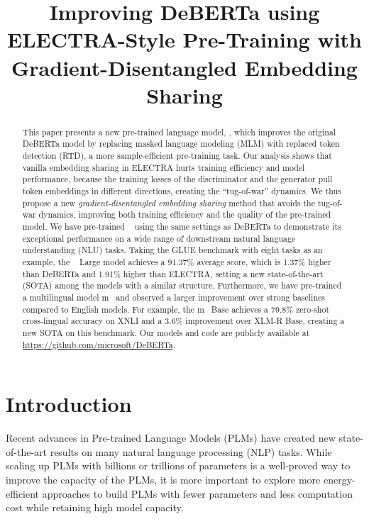 \title{Improving DeBERTa using ELECTRA-Style Pre-Training with Gradient-Disentangled Embedding Sharing}

\begin{abstract}
This paper presents a new pre-trained language model, \ModelName, which improves the original DeBERTa model by replacing masked language modeling (MLM) with replaced token detection (RTD), a more sample-efficient pre-training task. Our analysis shows that vanilla embedding sharing in ELECTRA hurts training efficiency and model performance, because the training losses of the discriminator and the generator pull token embeddings in different directions, creating the ``tug-of-war'' dynamics. We thus propose a new \emph{gradient-disentangled embedding sharing} method that avoids the tug-of-war dynamics, improving both training efficiency and the quality of the pre-trained model. We have pre-trained \ModelName~ using the same settings as  DeBERTa to demonstrate its exceptional performance on a wide range of downstream natural language understanding (NLU) tasks. Taking the GLUE benchmark with eight tasks as an example, the \ModelName~ Large model achieves a 91.37\% average score, which is 1.37\% higher than DeBERTa and 1.91\% higher than ELECTRA, setting a new state-of-the-art (SOTA) among the models with a similar structure. Furthermore, we have pre-trained a multilingual model m\ModelName~ and observed a larger improvement over strong baselines compared to  English models. For example, the m\ModelName~ Base achieves a 79.8\% zero-shot cross-lingual accuracy on XNLI and a 3.6\% improvement over XLM-R Base, creating a new SOTA on this benchmark. Our models and code are publicly available at \url{https://github.com/microsoft/DeBERTa}.
\end{abstract}

\section{Introduction}
Recent advances in Pre-trained Language Models (PLMs) have created new state-of-the-art results on many natural language processing (NLP) tasks. While scaling up PLMs with billions or trillions of parameters \citep{raffel2019t5, gpt2,gpt3,he2020deberta, fedus2021switch} is a well-proved way to improve the capacity of the PLMs, it is more important to explore more energy-efficient approaches to build PLMs with fewer parameters and less computation cost while retaining high model capacity. 

